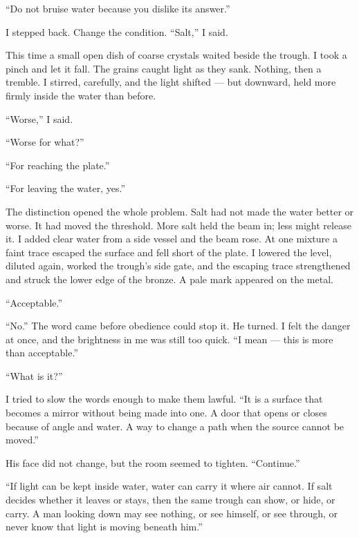 ``Do not bruise water because you dislike its answer.''\par

I stepped back. Change the condition. ``Salt,'' I said.\par

This time a small open dish of coarse crystals waited beside the trough. I took a pinch and let it fall. The grains caught light as they sank. Nothing, then a tremble. I stirred, carefully, and the light shifted --- but downward, held more firmly inside the water than before.\par

``Worse,'' I said.\par

``Worse for what?''\par

``For reaching the plate.''\par

``For leaving the water, yes.''\par

The distinction opened the whole problem. Salt had not made the water better or worse. It had moved the threshold. More salt held the beam in; less might release it. I added clear water from a side vessel and the beam rose. At one mixture a faint trace escaped the surface and fell short of the plate. I lowered the level, diluted again, worked the trough's side gate, and the escaping trace strengthened and struck the lower edge of the bronze. A pale mark appeared on the metal.\par

``Acceptable.''\par

``No.'' The word came before obedience could stop it. He turned. I felt the danger at once, and the brightness in me was still too quick. ``I mean --- this is more than acceptable.''\par

``What is it?''\par

I tried to slow the words enough to make them lawful. ``It is a surface that becomes a mirror without being made into one. A door that opens or closes because of angle and water. A way to change a path when the source cannot be moved.''\par

His face did not change, but the room seemed to tighten. ``Continue.''\par

``If light can be kept inside water, water can carry it where air cannot. If salt decides whether it leaves or stays, then the same trough can show, or hide, or carry. A man looking down may see nothing, or see himself, or see through, or never know that light is moving beneath him.''\par

